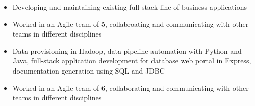 \documentclass[10pt,a4paper,ragged2e,withhyper]{altacv}
\begin{document}

\tagline{}


\makecvheader


\begin{itemize}
	\item Developing and maintaining existing full-stack line of business applications
	\item Worked in an Agile team of 5, collabroating and communicating with other teams in different disciplines
    \item Data provisioning in Hadoop, data pipeline automation with Python and Java, full-stack application development for database web portal in Express, documentation generation using SQL and JDBC

    \item Worked in an Agile team of 6, collaborating and communicating with other teams in different disciplines

\end{itemize}

\divider
\end{document}
